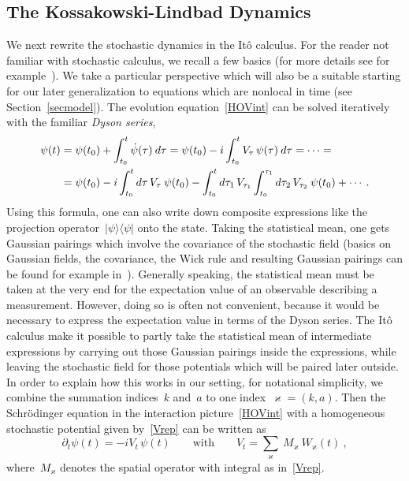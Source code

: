 \documentclass[reqno,11pt]{amsart}
\numberwithin{equation}{section}
\newcommand{\beq}{\begin{equation}}
\newcommand{\eeq}{\end{equation}}
\newcommand{\la}{\langle}
\newcommand{\ra}{\rangle}
\newcommand{\1}{\mathds{1}}
\newcommand\Felix[1]{}
\begin{document}
\subsection{The Kossakowski-Lindbad Dynamics}
We next rewrite the stochastic dynamics in the It\^o calculus. For the reader not familiar with
stochastic calculus, we recall a few basics (for more details see for example~\cite{arnold-l}).
We take a particular perspective which will also be a suitable starting for our later generalization to equations
which are nonlocal in time (see Section~\ref{secmodel}). The evolution equation~\eqref{HOVint} can be
solved iteratively with the familiar {\em{Dyson series}},
\Felix{Hier auch schon ein Bildchen?}%
\begin{align}
\psi(t) &= \psi(t_0) + \int_{t_0}^t \dot{\psi}(\tau)\: d\tau = \psi(t_0) -i  \int_{t_0}^t V_\tau\,  \psi(\tau)\: d\tau
= \cdots = \notag \\
&=  \psi(t_0) -i \int_{t_0}^t d\tau \,V_\tau\: \psi(t_0)
- \int_{t_0}^t d\tau_1 \,V_{\tau_1} \int_{t_0}^{\tau_1} d\tau_2 \,V_{\tau_2}\: \psi(t_0) + \cdots \:. \label{dyson}
\end{align}
Using this formula, one can also write down composite expressions like the projection
operator~$|\psi \ra \la \psi|$ onto the state. Taking the statistical mean, one gets Gaussian pairings
which involve the covariance of the stochastic field
(basics on Gaussian fields, the covariance, the Wick rule and resulting Gaussian pairings
can be found for example in~\cite[Section~6.2]{glimm+jaffe}).
Generally speaking, the statistical mean must be taken at the very end for the
expectation value of an observable describing a measurement. However, doing so is often not convenient,
because it would be necessary to express the expectation value in terms of the Dyson series.
The It\^o calculus make it possible to partly take the statistical mean of intermediate expressions
by carrying out those Gaussian pairings inside the expressions, while leaving the stochastic field
for those potentials which will be paired later outside.
In order to explain how this works in our setting, for notational simplicity, we combine the summation indices~$k$ and~$a$ to one index~$\varkappa = (k, a)$. Then the Schr\"odinger equation in the
interaction picture~\eqref{HOVint} with a homogeneous stochastic potential given by~\eqref{Vrep} can be written as
\beq \label{schstoch}
 \partial_t \psi(t) = -i V_t\, \psi(t) \qquad \text{with} \qquad V_t =  \sum_\varkappa \: M_\varkappa\: W_\varkappa(t) \:,
\eeq
where~$M_\varkappa$ denotes the spatial operator with integral as in~\eqref{Vrep}.
\end{document}
